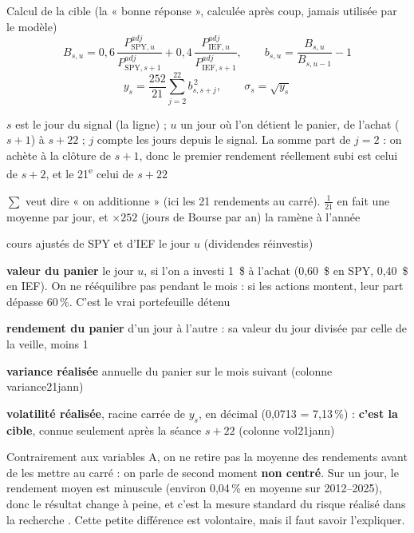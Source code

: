 \documentclass[10pt,a4paper]{article}
\newcommand{\coupure}{\textunderscore\allowbreak}
\newcommand{\fic}[1]{{\small\ttfamily\let\_\coupure #1}}
\newcommand{\SPY}{\mathrm{SPY}}
\newcommand{\IEF}{\mathrm{IEF}}
\newcommand{\notation}[2]{\makebox[2.3cm][l]{#1}\parbox[t]{\dimexpr\linewidth-2.3cm\relax}{#2}\par}
\begin{document}
\begin{formule}{Calcul de la cible (la « bonne réponse », calculée après coup, jamais utilisée par le modèle)}
\begin{equation}\label{eq:valeurpanier}
B_{s,u}=0{,}6\,\frac{P^{adj}_{\SPY,u}}{P^{adj}_{\SPY,s+1}}+0{,}4\,\frac{P^{adj}_{\IEF,u}}{P^{adj}_{\IEF,s+1}},\qquad
b_{s,u}=\frac{B_{s,u}}{B_{s,u-1}}-1
\end{equation}
\begin{equation}\label{eq:cible}
y_s=\frac{252}{21}\sum_{j=2}^{22}b_{s,s+j}^{\,2},\qquad \sigma_s=\sqrt{y_s}
\end{equation}
\notation{$s,\ u,\ j$}{$s$ est le jour du signal (la ligne) ; $u$ un jour où l'on détient le panier, de l'achat ($s+1$) à $s+22$ ; $j$ compte les jours depuis le signal. La somme part de $j=2$ : on achète à la clôture de $s+1$, donc le premier rendement réellement subi est celui de $s+2$, et le 21\textsuperscript{e} celui de $s+22$}
\notation{$\sum,\ \frac{252}{21}$}{$\sum$ veut dire « on additionne » (ici les 21 rendements au carré). $\frac{1}{21}$ en fait une moyenne par jour, et $\times252$ (jours de Bourse par an) la ramène à l'année}
\notation{$P^{adj}_{\cdot,u}$}{cours ajustés de SPY et d'IEF le jour $u$ (dividendes réinvestis)}
\notation{$B_{s,u}$}{\textbf{valeur du panier} le jour $u$, si l'on a investi 1~\$ à l'achat (0,60~\$ en SPY, 0,40~\$ en IEF). On ne rééquilibre pas pendant le mois : si les actions montent, leur part dépasse 60\,\%. C'est le vrai portefeuille détenu}
\notation{$b_{s,u}$}{\textbf{rendement du panier} d'un jour à l'autre : sa valeur du jour divisée par celle de la veille, moins 1}
\notation{$y_s$}{\textbf{variance réalisée} annuelle du panier sur le mois suivant (colonne \fic{variance\_21j\_ann})}
\notation{$\sigma_s$}{\textbf{volatilité réalisée}, racine carrée de $y_s$, en décimal (0,0713 = 7,13\,\%) : \textbf{c'est la cible}, connue seulement après la séance $s+22$ (colonne \fic{vol\_21j\_ann})}
\end{formule}
Contrairement aux variables A, on ne retire pas la moyenne des rendements avant de les mettre au carré : on parle de second moment \textbf{non centré}. Sur un jour, le rendement moyen est minuscule (environ 0,04\,\% en moyenne sur 2012--2025), donc le résultat change à peine, et c'est la mesure standard du risque réalisé dans la recherche \cite{patton}. Cette petite différence est volontaire, mais il faut savoir l'expliquer.
\end{document}
